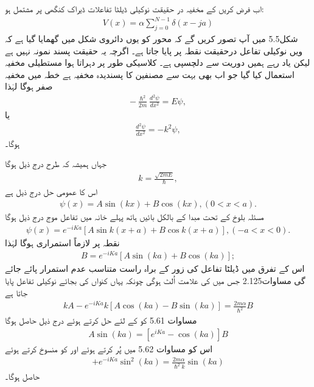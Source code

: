 اب فرض کریں کے مخفیہ در حقیقت نوکیلی ڈیلٹا تفاعلات ڈیراک کنگھی پر مشتمل ہو:
\begin{align}
	V(x) = \alpha\sum_{j=0}^{N-1}\delta(x-ja)
\end{align}
شکل\num{5.5} میں آپ تصور کریں گے  کہ محور  کو یوں دائروی شکل میں  گھمایا گیا ہے کہ ویں نوکیلی تفاعل درحقیقت نقطہ   پر پایا جاتا ہے۔ اگرچہ یہ حقیقت پسند نمونہ نہیں ہے لیکن یاد رہے ہمیں دوریت سے دلچسپی ہے۔ کلاسیکی طور پر دہراتا ہوا مستطیلی مخفیہ استعمال کیا گیا جو اب بھی بہت سے مصنفین کا پسندیدہ مخفیہ ہے خطہ  میں مخفیہ صفر ہوگا لہٰذا 
\begin{align*}
	-\frac{\hslash^{2}}{2m}\frac{d^{2}\psi}{dx^{2}} = E\psi,
\end{align*}
یا
\begin{align*}
	\frac{d^{2}\psi}{dx^{2}} = -k^{2}\psi,
\end{align*}
ہوگا۔

جہاں ہمیشہ کہ طرح درج ذیل ہوگا 
\begin{align}
	k = \frac{\sqrt{2mE}}{\hslash},
\end{align}
اس کا عمومی حل درج ذیل ہے 
\begin{align}
	\psi(x) = A\sin(kx) + B\cos(kx), (0<x<a).
\end{align}
مسئلہ بلوخ کے تحت مبدا کے بالکل بائیں ہاتھ پہلے خانہ میں تفاعل موج درج ذیل ہوگا 
\begin{align}
	\psi(x) = e^{-iKa}[A\sin k(x+a) + B\cos k(x+a)], (-a<x<0). 
\end{align}
نقطہ پر  لازماً استمراری ہوگا لہٰذا 
\begin{align}
	B = e^{-iKa}[A\sin(ka) + B\cos(ka)];
\end{align}
اس کے تفرق میں ڈیلٹا تفاعل کی زور کے براہ راست متناسب عدم استمرار پائے جائے گی مساوات\num{2.125} جس میں  کی علامت اُلٹ ہوگی چونکہ یہاں کنواں کی بجائے نوکیلی تفاعل پایا جاتا ہے
\begin{align}
	kA - e^{-iKa}k[A\cos(ka) - B\sin(ka)] = \frac{2m\alpha}{\hslash^{2}}B
\end{align}
مساوات \num{5.61} کو  کے لئے حل کرتے ہوئے درج ذیل حاصل ہوگا 
\begin{align}
	A\sin(ka) = [e^{iKa}-\cos(ka)]B
\end{align}
اس کو مساوات \num{5.62} میں پُر کرتے ہوئے اور  کو منسوخ کرتے ہوئے 
\begin{align*}
	[e^{iKa}-\cos(ka)][1-e^{-iKa}\cos(ka)] + e^{-iKa}\sin^{2}(ka) = \frac{2m\alpha}{\hslash^{2}k}\sin(ka)
\end{align*}
حاصل ہوگا۔

